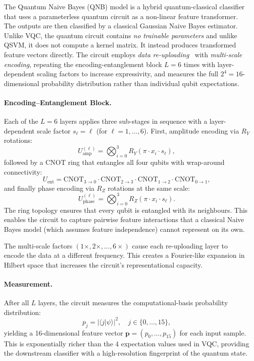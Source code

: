 \documentclass[runningheads]{llncs}
\begin{document}
The Quantum Naive Bayes (QNB) model is a hybrid quantum-classical classifier that uses a parameterless quantum circuit as a non-linear feature transformer. The outputs are then classified by a classical Gaussian Naive Bayes estimator. Unlike VQC, the quantum circuit contains \emph{no trainable parameters} and unlike QSVM, it does not compute a kernel matrix. It instead produces transformed feature vectors directly. The circuit employs \emph{data re-uploading}~\cite{perez2020} with \emph{multi-scale encoding}, repeating the encoding-entanglement block $L=6$ times with layer-dependent scaling factors to increase expressivity, and measures the full $2^4=16$-dimensional probability distribution rather than individual qubit expectations.

\paragraph{Encoding--Entanglement Block.}
Each of the $L=6$ layers applies three sub-stages in sequence with a layer-dependent scale factor $s_\ell = \ell$ (for $\ell = 1,\ldots,6$). First, amplitude encoding via $R_Y$ rotations:
\begin{equation}
U_{\text{amp}}^{(\ell)} = \bigotimes_{i=0}^{3} R_Y(\pi \cdot x_i \cdot s_\ell),
\end{equation}
followed by a CNOT ring that entangles all four qubits with wrap-around connectivity:
\begin{equation}
U_{\text{ent}} = \text{CNOT}_{3 \to 0} \cdot \text{CNOT}_{2 \to 3} \cdot \text{CNOT}_{1 \to 2} \cdot \text{CNOT}_{0 \to 1},
\end{equation}
and finally phase encoding via $R_Z$ rotations at the same scale:
\begin{equation}
U_{\text{phase}}^{(\ell)} = \bigotimes_{i=0}^{3} R_Z(\pi \cdot x_i \cdot s_\ell).
\end{equation}
The ring topology ensures that every qubit is entangled with its neighbours. This enables the circuit to capture pairwise feature interactions that a classical Naive Bayes model (which assumes feature independence) cannot represent on its own. 

The multi-scale factors $(1\times, 2\times, \ldots, 6\times)$ cause each re-uploading layer to encode the data at a different frequency. This creates a Fourier-like expansion in Hilbert space that increases the circuit's representational capacity.

\paragraph{Measurement.}
After all $L$ layers, the circuit measures the computational-basis probability distribution:
\begin{equation}
p_j = |\langle j | \psi \rangle|^2, \quad j \in \{0,\ldots,15\},
\end{equation}
yielding a 16-dimensional feature vector $\mathbf{p} = (p_0, \ldots, p_{15})$ for each input sample. This is exponentially richer than the 4 expectation values used in VQC, providing the downstream classifier with a high-resolution fingerprint of the quantum state.
\end{document}
